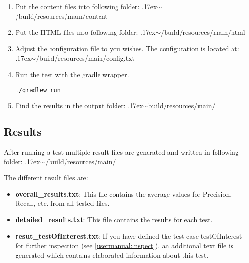 \begin{enumerate}
\item Put the content files into following folder: {\raise.17ex\hbox{$\scriptstyle\sim$}}/build/resources/main/content
\item Put the HTML files into following folder: {\raise.17ex\hbox{$\scriptstyle\sim$}}/build/resources/main/html
\item Adjust the configuration file to you wishes. The configuration is located at: {\raise.17ex\hbox{$\scriptstyle\sim$}}/build/resources/main/config.txt
\item Run the test with the gradle wrapper.

\begin{lstlisting}
./gradlew run
\end{lstlisting}
\item Find the results in the output folder: {\raise.17ex\hbox{$\scriptstyle\sim$}}build/resources/main/
\end{enumerate}

\subsection{Results}

After running a test multiple result files are generated and written in following folder: {\raise.17ex\hbox{$\scriptstyle\sim$}}/build/resources/main/

The different result files are:
\begin{itemize}

\item \textbf{overall\_results.txt}: This file contains the average values for Precision, Recall, etc. from all tested files.
\item \textbf{detailed\_results.txt}: This file contains the results for each test. 
\item \textbf{resut\_testOfInterest.txt}: If you have defined the test case testOfInterest for further inspection (see \ref{usermanual:inspect}), an additional text file is generated which contains elaborated information about this test.
\end{itemize}